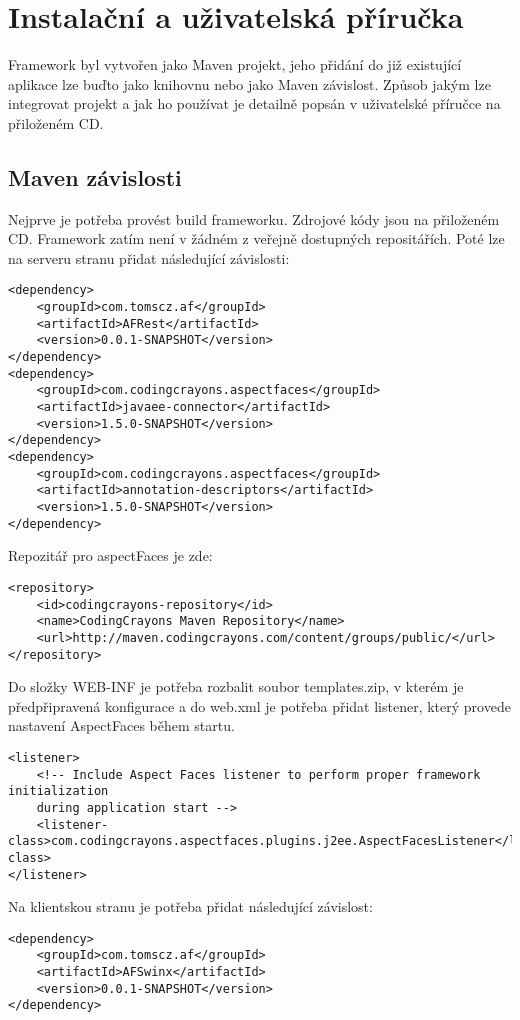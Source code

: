 \chapter{Instalační a uživatelská příručka}
Framework byl vytvořen jako Maven projekt, jeho přidání do již existující aplikace lze buďto jako knihovnu nebo jako Maven závislost. Způsob jakým lze integrovat projekt a jak ho používat je detailně popsán v uživatelské příručce na přiloženém CD. 
\section{Maven závislosti}
Nejprve je potřeba provést build frameworku. Zdrojové kódy jsou na přiloženém CD. Framework zatím není v žádném z veřejně dostupných repositářích. Poté lze na serveru stranu přidat následující závislosti:
\begin{lstlisting}[caption={Závislosti na serveru},
label={code:mavenDependency}]
<dependency>
	<groupId>com.tomscz.af</groupId>
	<artifactId>AFRest</artifactId>
	<version>0.0.1-SNAPSHOT</version>
</dependency>
<dependency>
	<groupId>com.codingcrayons.aspectfaces</groupId>
	<artifactId>javaee-connector</artifactId>
	<version>1.5.0-SNAPSHOT</version>
</dependency>
<dependency>
	<groupId>com.codingcrayons.aspectfaces</groupId>
	<artifactId>annotation-descriptors</artifactId>
	<version>1.5.0-SNAPSHOT</version>
</dependency>
\end{lstlisting}
Repozitář pro aspectFaces je zde:
\begin{lstlisting}[caption={AspectFaces repozitář },
label={code:mavenAspectFacesRepo}]
<repository>
	<id>codingcrayons-repository</id>
	<name>CodingCrayons Maven Repository</name>
	<url>http://maven.codingcrayons.com/content/groups/public/</url>
</repository>
\end{lstlisting}
Do složky WEB-INF je potřeba rozbalit soubor templates.zip, v kterém je předpřipravená konfigurace a do web.xml je potřeba přidat listener, který provede nastavení AspectFaces během startu. 
\begin{lstlisting}[caption={AspectFaces listener},
label={code:mavenAspectFacesBootStrap}]
<listener>
	<!-- Include Aspect Faces listener to perform proper framework initialization 
	during application start -->
	<listener-class>com.codingcrayons.aspectfaces.plugins.j2ee.AspectFacesListener</listener-class>
</listener>
\end{lstlisting}
Na klientskou stranu je potřeba přidat následující závislost:
\begin{lstlisting}[caption={Závislost na klientské straně},
label={code:mavenAFSwinx}]
<dependency>
	<groupId>com.tomscz.af</groupId>
	<artifactId>AFSwinx</artifactId>
	<version>0.0.1-SNAPSHOT</version>
</dependency>
\end{lstlisting}
